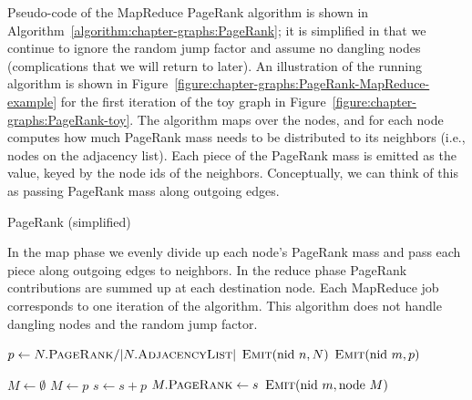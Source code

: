 Pseudo-code of the MapReduce PageRank algorithm is shown in
Algorithm~\ref{algorithm:chapter-graphs:PageRank}; it is simplified in that we
continue to ignore the random jump factor and assume no dangling nodes
(complications that we will return to later).  An illustration of the
running algorithm is shown in
Figure~\ref{figure:chapter-graphs:PageRank-MapReduce-example} for the first
iteration of the toy graph in
Figure~\ref{figure:chapter-graphs:PageRank-toy}.  The algorithm maps over
the nodes, and for each node computes how much PageRank mass needs to
be distributed to its neighbors (i.e., nodes on the adjacency list).
Each piece of the PageRank mass is emitted as the value, keyed by the node
ids of the neighbors.  Conceptually, we can think of this as passing
PageRank mass along outgoing edges.

\begin{algorithm}[t]
 \caption{PageRank (simplified)}
\label{algorithm:chapter-graphs:PageRank}
In the map phase we evenly divide up each node's PageRank mass and
pass each piece along outgoing edges to neighbors.  In the reduce
phase PageRank contributions are summed up at each destination node.
Each MapReduce job corresponds to one iteration of the algorithm. This
algorithm does not handle dangling nodes and the random jump factor.

\algrenewcommand{}
\algrenewcommand{}
  \begin{algorithmic}[1]
    \State $p \gets N.\textsc{PageRank} / |N.\textsc{AdjacencyList}|$
    \State $\textsc{Emit}(\textrm{nid }n, N)$
      \State $\textsc{Emit}(\textrm{nid }m, p)$
    \EndFor
    \EndProcedure
    \EndFunction
  \end{algorithmic}

  \begin{algorithmic}[1]
    \State $M \gets \emptyset$
        \State $M \gets p$
      \Else
        \State $s \gets s + p$
      \EndIf
    \EndFor
    \State $M.\textsc{PageRank} \gets s$
    \State $\textsc{Emit}(\textrm{nid }m, \textrm{node }M)$
    \EndProcedure
    \EndFunction
  \end{algorithmic}
\end{algorithm}

